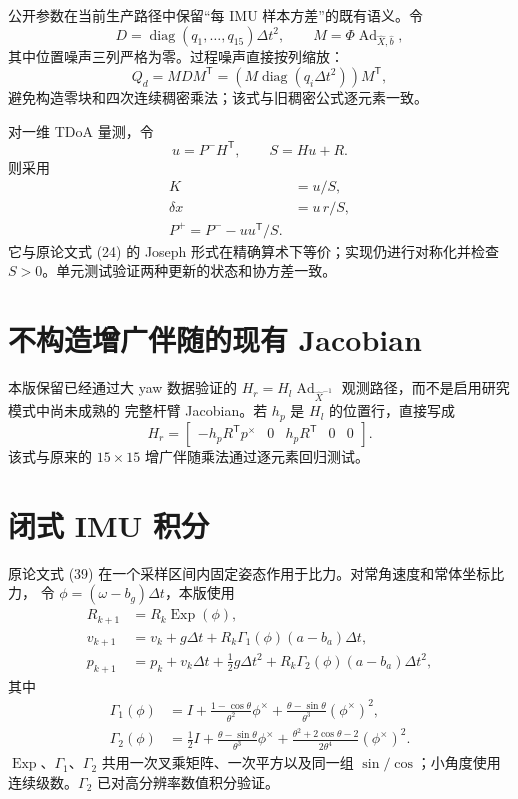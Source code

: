 \documentclass[11pt,a4paper]{ctexart}
\begin{document}
公开参数在当前生产路径中保留“每 IMU 样本方差”的既有语义。令
\begin{equation}
 D=\operatorname{diag}(q_1,\ldots,q_{15})\Delta t^2,\qquad
 M=\Phi\operatorname{Ad}_{\hat X,\hat b},
\end{equation}
其中位置噪声三列严格为零。过程噪声直接按列缩放：
\begin{equation}
 Q_d=MDM^{\mathsf T}
 =\left(M\operatorname{diag}(q_i\Delta t^2)\right)M^{\mathsf T},
\end{equation}
避免构造零块和四次连续稠密乘法；该式与旧稠密公式逐元素一致。

对一维 TDoA 量测，令
\begin{equation}
 u=P^-H^{\mathsf T},\qquad S=Hu+R.
\end{equation}
则采用
\begin{align}
 K&=u/S,\\
 \delta x&=u\,r/S,\\
 \boxed{P^+=P^--uu^{\mathsf T}/S.}
\end{align}
它与原论文式 (24) 的 Joseph 形式在精确算术下等价；实现仍进行对称化并检查
$S>0$。单元测试验证两种更新的状态和协方差一致。

\section{不构造增广伴随的现有 Jacobian}

本版保留已经通过大 yaw 数据验证的
$H_r=H_l\operatorname{Ad}_{\hat X^{-1}}$ 观测路径，而不是启用研究模式中尚未成熟的
完整杆臂 Jacobian。若 $h_p$ 是 $H_l$ 的位置行，直接写成
\begin{equation}
 \boxed{
 H_r=
 \begin{bmatrix}
 -h_pR^{\mathsf T}p^\times&0&h_pR^{\mathsf T}&0&0
 \end{bmatrix}.}
\end{equation}
该式与原来的 $15\times15$ 增广伴随乘法通过逐元素回归测试。

\section{闭式 IMU 积分}

原论文式 (39) 在一个采样区间内固定姿态作用于比力。对常角速度和常体坐标比力，
令 $\phi=(\omega-b_g)\Delta t$，本版使用
\begin{align}
 R_{k+1}&=R_k\operatorname{Exp}(\phi),\\
 v_{k+1}&=v_k+g\Delta t+
 R_k\Gamma_1(\phi)(a-b_a)\Delta t,\\
 p_{k+1}&=p_k+v_k\Delta t+\tfrac12g\Delta t^2+
 R_k\Gamma_2(\phi)(a-b_a)\Delta t^2,
\end{align}
其中
\begin{align}
 \Gamma_1(\phi)
 &=I+\frac{1-\cos\theta}{\theta^2}\phi^\times
 +\frac{\theta-\sin\theta}{\theta^3}(\phi^\times)^2,\\
 \Gamma_2(\phi)
 &=\frac12I+\frac{\theta-\sin\theta}{\theta^3}\phi^\times
 +\frac{\theta^2+2\cos\theta-2}{2\theta^4}(\phi^\times)^2.
\end{align}
$\operatorname{Exp}$、$\Gamma_1$、$\Gamma_2$ 共用一次叉乘矩阵、一次平方以及同一组
$\sin/\cos$；小角度使用连续级数。$\Gamma_2$ 已对高分辨率数值积分验证。
\end{document}
